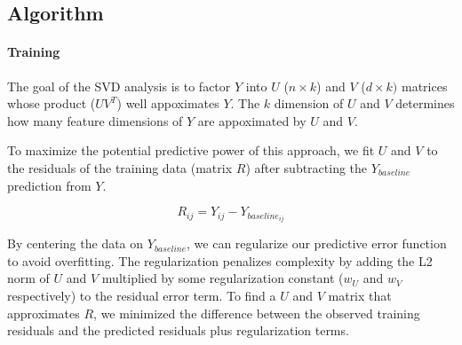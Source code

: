 \documentclass[12pt]{article}
\begin{document}

\subsection*{Algorithm}
\paragraph{Training} The goal of the SVD analysis is to factor $Y$ into $U$ ($n \times k$) and $V$ ($d \times k)$ matrices whose product ($U V^T$) well appoximates $Y$. The $k$ dimension of $U$ and $V$ determines how many feature dimensions of $Y$ are appoximated by $U$ and $V$.

To maximize the potential predictive power of this approach, we fit $U$ and $V$ to the residuals of the training data (matrix $R$) after subtracting the $Y_{baseline}$ prediction from $Y$.

 $$ R_{ij} = Y_{ij} - Y_{baseline_{ij}} $$

 By centering the data on $Y_{baseline}$, we can regularize our predictive error function to avoid overfitting. The regularization penalizes complexity by adding the L2 norm of $U$ and $V$ multiplied by some regularization constant ($w_U$ and $w_V$ respectively) to the residual error term. To find a $U$ and $V$ matrix that approximates $R$, we minimized the difference between the observed training residuals and the predicted residuals plus regularization terms.
\end{document}
